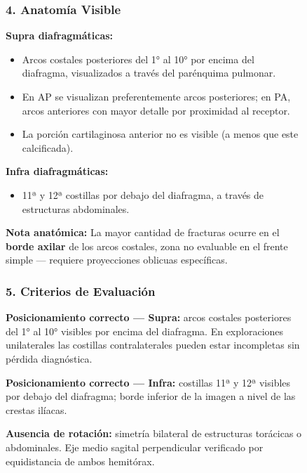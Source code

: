 \begin{figure}
{\clearpage
\subsubsection*{4. Anatomía Visible}

\textbf{Supra diafragmáticas:}
\begin{itemize}
  \item Arcos costales posteriores del 1° al 10° por encima del diafragma, visualizados a través del parénquima pulmonar.
  \item En AP se visualizan preferentemente arcos posteriores; en PA, arcos anteriores con mayor detalle por proximidad al receptor.
  \item La porción cartilaginosa anterior no es visible (a menos que este    calcificada).
\end{itemize}

\textbf{Infra diafragmáticas:}
\begin{itemize}
  \item 11ª y 12ª costillas por debajo del diafragma, a través de estructuras abdominales.
\end{itemize}

\textbf{Nota anatómica:} La mayor cantidad de fracturas ocurre en el \textbf{borde axilar} de los arcos costales, zona no evaluable en el frente simple — requiere proyecciones oblicuas específicas.

\subsubsection*{5. Criterios de Evaluación}

\textbf{Posicionamiento correcto — Supra:} arcos costales posteriores del 1° al 10° visibles por encima del diafragma. En exploraciones unilaterales las costillas contralaterales pueden estar incompletas sin pérdida diagnóstica.

\textbf{Posicionamiento correcto — Infra:} costillas 11ª y 12ª visibles por debajo del diafragma; borde inferior de la imagen a nivel de las crestas ilíacas.

\textbf{Ausencia de rotación:} simetría bilateral de estructuras torácicas o abdominales. Eje medio sagital perpendicular verificado por equidistancia de ambos hemitórax.

}
\end{figure}
